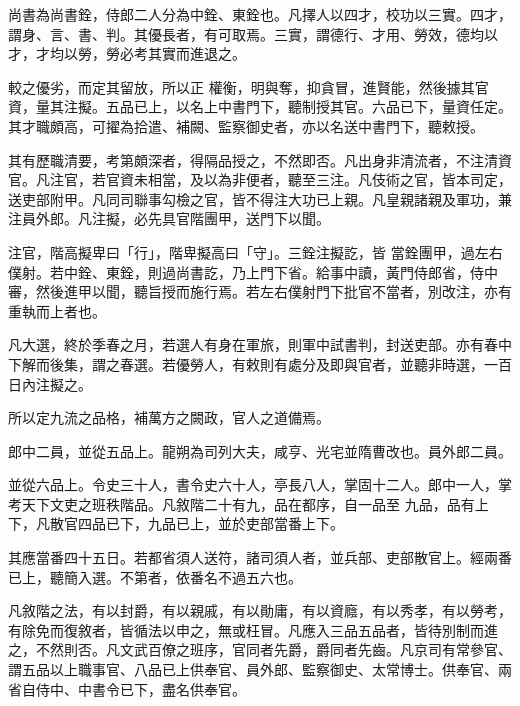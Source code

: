 \begin{pinyinscope}
 尚書為尚書銓，侍郎二人分為中銓、東銓也。凡擇人以四才，校功以三實。四才，謂身、言、書、判。其優長者，有可取焉。三實，謂德行、才用、勞效，德均以才，才均以勞，勞必考其實而進退之。



 較之優劣，而定其留放，所以正
 權衡，明與奪，抑貪冒，進賢能，然後據其官資，量其注擬。五品已上，以名上中書門下，聽制授其官。六品已下，量資任定。其才職頗高，可擢為拾遣、補闕、監察御史者，亦以名送中書門下，聽敕授。



 其有歷職清要，考第頗深者，得隔品授之，不然即否。凡出身非清流者，不注清資官。凡注官，若官資未相當，及以為非便者，聽至三注。凡伎術之官，皆本司定，送吏部附甲。凡同司聯事勾檢之官，皆不得注大功已上親。凡皇親諸親及軍功，兼注員外郎。凡注擬，必先具官階團甲，送門下以聞。



 注官，階高擬卑曰「行」，階卑擬高曰「守」。三銓注擬訖，皆
 當銓團甲，過左右僕射。若中銓、東銓，則過尚書訖，乃上門下省。給事中讀，黃門侍郎省，侍中審，然後進甲以聞，聽旨授而施行焉。若左右僕射門下批官不當者，別改注，亦有重執而上者也。



 凡大選，終於季春之月，若選人有身在軍旅，則軍中試書判，封送吏部。亦有春中下解而後集，謂之春選。若優勞人，有敕則有處分及即與官者，並聽非時選，一百日內注擬之。



 所以定九流之品格，補萬方之闕政，官人之道備焉。



 郎中二員，並從五品上。龍朔為司列大夫，咸亨、光宅並隋曹改也。員外郎二員。



 並從六品上。令史三十人，書令史六十人，亭長八人，掌固十二人。郎中一人，掌考天下文吏之班秩階品。凡敘階二十有九，品在都序，自一品至
 九品，品有上下，凡散官四品已下，九品已上，並於吏部當番上下。



 其應當番四十五日。若都省須人送符，諸司須人者，並兵部、吏部散官上。經兩番已上，聽簡入選。不第者，依番名不過五六也。



 凡敘階之法，有以封爵，有以親戚，有以勛庸，有以資廕，有以秀孝，有以勞考，有除免而復敘者，皆循法以申之，無或枉冒。凡應入三品五品者，皆待別制而進之，不然則否。凡文武百僚之班序，官同者先爵，爵同者先齒。凡京司有常參官、謂五品以上職事官、八品已上供奉官、員外郎、監察御史、太常博士。供奉官、兩省自侍中、中書令已下，盡名供奉官。




\end{pinyinscope}
